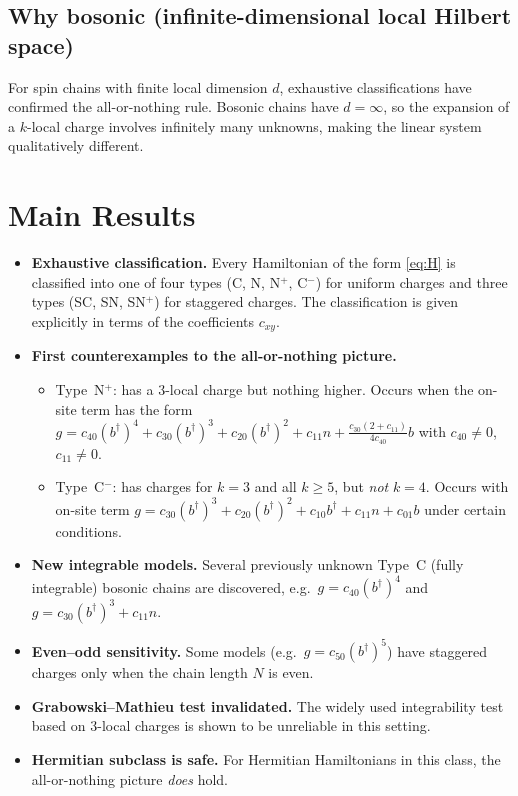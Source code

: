 \documentclass[11pt,a4paper]{article}
\begin{document}
\subsection*{Why bosonic (infinite-dimensional local Hilbert space)}
For spin chains with finite local dimension $d$, exhaustive classifications have confirmed the all-or-nothing rule. Bosonic chains have $d=\infty$, so the expansion of a $k$-local charge involves infinitely many unknowns, making the linear system qualitatively different.

\section{Main Results}

\begin{itemize}
  \item \textbf{Exhaustive classification.} Every Hamiltonian of the form \eqref{eq:H} is classified into one of four types (C, N, N$^+$, C$^-$) for uniform charges and three types (SC, SN, SN$^+$) for staggered charges. The classification is given explicitly in terms of the coefficients $c_{xy}$.

  \item \textbf{First counterexamples to the all-or-nothing picture.}
    \begin{itemize}[nosep]
      \item Type~N$^+$: has a $3$-local charge but nothing higher. Occurs when the on-site term has the form $g = c_{40}(b^\dagger)^4 + c_{30}(b^\dagger)^3 + c_{20}(b^\dagger)^2 + c_{11}n + \frac{c_{30}(2+c_{11})}{4c_{40}}b$ with $c_{40}\neq 0$, $c_{11}\neq 0$.
      \item Type~C$^-$: has charges for $k=3$ and all $k\ge 5$, but \emph{not} $k=4$. Occurs with on-site term $g = c_{30}(b^\dagger)^3 + c_{20}(b^\dagger)^2 + c_{10}b^\dagger + c_{11}n + c_{01}b$ under certain conditions.
    \end{itemize}

  \item \textbf{New integrable models.} Several previously unknown Type~C (fully integrable) bosonic chains are discovered, e.g.\ $g = c_{40}(b^\dagger)^4$ and $g = c_{30}(b^\dagger)^3 + c_{11}n$.

  \item \textbf{Even--odd sensitivity.} Some models (e.g.\ $g = c_{50}(b^\dagger)^5$) have staggered charges only when the chain length $N$ is even.

  \item \textbf{Grabowski--Mathieu test invalidated.} The widely used integrability test based on $3$-local charges is shown to be unreliable in this setting.

  \item \textbf{Hermitian subclass is safe.} For Hermitian Hamiltonians in this class, the all-or-nothing picture \emph{does} hold.
\end{itemize}
\end{document}
